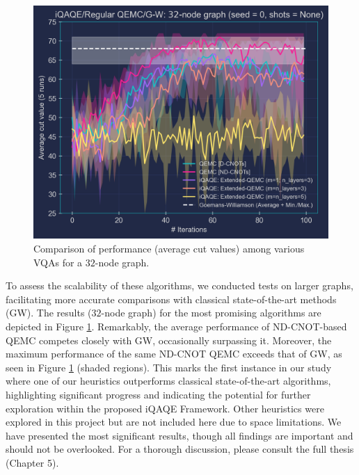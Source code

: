 \begin{figure}[H]
    \centering
    \includegraphics[width=0.95\columnwidth]{Figures/Large graphs/32-node_Graph_seed=0.png}
    \caption{Comparison of performance (average cut values) among various VQAs for a $32$-node graph.}
    \label{fig:32-node_Graph}
\end{figure}

To assess the scalability of these algorithms, we conducted tests on larger graphs, facilitating more accurate comparisons with classical state-of-the-art methods (GW). The results ($32$-node graph) for the most promising algorithms are depicted in Figure \ref{fig:32-node_Graph}. Remarkably, the average performance of ND-CNOT-based QEMC competes closely with GW, occasionally surpassing it. Moreover, the maximum performance of the same ND-CNOT QEMC exceeds that of GW, as seen in Figure \ref{fig:32-node_Graph} (shaded regions). This marks the first instance in our study where one of our heuristics outperforms classical state-of-the-art algorithms, highlighting significant progress and indicating the potential for further exploration within the proposed iQAQE Framework. Other heuristics were explored in this project but are not included here due to space limitations. We have presented the most significant results, though all findings are important and should not be overlooked. For a thorough discussion, please consult the full thesis (Chapter 5).

